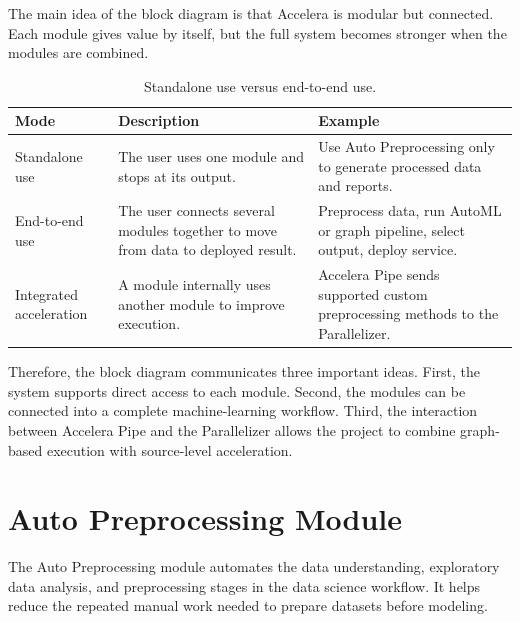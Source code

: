 \documentclass[12pt,a4paper]{report}
\newcommand{\acceleraTableStyle}{%
\small
\renewcommand{\arraystretch}{1.15}
\setlength{\tabcolsep}{4pt}%
}
\begin{document}
The main idea of the block diagram is that Accelera is modular but connected.
Each module gives value by itself, but the full system becomes stronger when the
modules are combined.
\begin{table}[!htbp]
\centering
\acceleraTableStyle
\caption{Standalone use versus end-to-end use.}
\label{tab:standalone-vs-e2e}
\begin{tabularx}{\textwidth}{p{}X X}
\toprule
\textbf{Mode} & \textbf{Description} & \textbf{Example} \\
\midrule

Standalone use &
The user uses one module and stops at its output. &
Use Auto Preprocessing only to generate processed data and reports. \\
\midrule

End-to-end use &
The user connects several modules together to move from data to deployed result. &
Preprocess data, run AutoML or graph pipeline, select output, deploy service. \\
\midrule

Integrated acceleration &
A module internally uses another module to improve execution. &
Accelera Pipe sends supported custom preprocessing methods to the Parallelizer. \\

\bottomrule
\end{tabularx}
\end{table}

Therefore, the block diagram communicates three important ideas. First, the
system supports direct access to each module. Second, the modules can be
connected into a complete machine-learning workflow. Third, the interaction
between Accelera Pipe and the Parallelizer allows the project to combine
graph-based execution with source-level acceleration.




\clearpage
\section{Auto Preprocessing Module}
\noindent The Auto Preprocessing module automates the data understanding, exploratory data analysis, and preprocessing stages in the data science workflow. It helps reduce the repeated manual work needed to prepare datasets before modeling.
\end{document}
